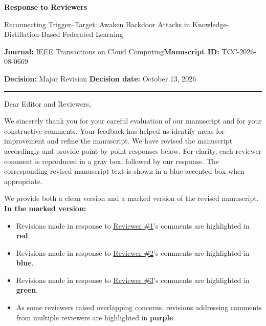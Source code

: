 \documentclass[11pt,a4paper]{article}
\begin{document}
\begin{center}
  {\LARGE\bfseries\color{headingnavy}Response to Reviewers}\par
  \vspace{0.7em}
  {\large Reconnecting Trigger–Target: Awaken Backdoor Attacks in Knowledge-Distillation-Based Federated Learning}\par
  \vspace{0.7em}
  {\color{mutedgray}\textbf{Journal:} IEEE Transactions on Cloud Computing\quad\textbf{Manuscript ID:} TCC-2026-08-0669}\par
  \vspace{0.3em}
  {\color{mutedgray}\textbf{Decision:} Major Revision \quad\textbf{Decision date:} October 13, 2026}\par
\end{center}
\vspace{0.5em}\hrule\vspace{1em}

Dear Editor and Reviewers,

We sincerely thank you for your careful evaluation of our manuscript and for your constructive comments. 
Your feedback has helped us identify areas for improvement and refine the manuscript. 
We have revised the manuscript accordingly and provide point-by-point responses below.
For clarity, each reviewer comment is reproduced in a gray box, followed by our response. The corresponding revised manuscript text is shown in a blue-accented box when appropriate.

We provide both a clean version and a marked version of the revised manuscript.
\textbf{In the marked version:}
\begin{itemize}
    \item Revisions made in response to \hyperlink{reviewer:1}{Reviewer \#1}'s comments
    are highlighted in \textcolor{reviewer1}{\textbf{red}}.

    \item Revisions made in response to \hyperlink{reviewer:2}{Reviewer \#2}'s comments
    are highlighted in \textcolor{reviewer2}{\textbf{blue}}.

    \item Revisions made in response to \hyperlink{reviewer:3}{Reviewer \#3}'s comments
    are highlighted in \textcolor{reviewer3}{\textbf{green}}.

    \item As some reviewers raised overlapping concerns, revisions addressing comments from multiple reviewers are highlighted in \textcolor{share}{\textbf{purple}}.
\end{itemize}
\end{document}
